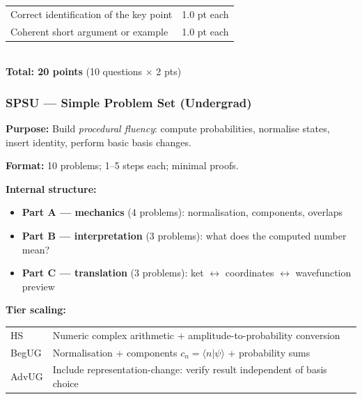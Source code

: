 \documentclass[11pt,a4paper]{article}
\begin{document}
\begin{tcolorbox}[rubricbox, title={CCQU Rubric}]
\begin{tabular}{ll}
  Correct identification of the key point & 1.0 pt each\\
  Coherent short argument or example       & 1.0 pt each\\
\end{tabular}\\[4pt]
\textbf{Total: 20 points} (10 questions $\times$ 2 pts)
\end{tcolorbox}

\bigskip
\subsubsection{SPSU --- Simple Problem Set (Undergrad)}

\begin{tcolorbox}[ugprobbox, title={SPSU --- Simple Problem Set, Undergraduate \hfill\normalfont 10 problems}]

\textbf{Purpose:} Build \emph{procedural fluency}: compute probabilities, normalise
states, insert identity, perform basic basis changes.

\medskip\textbf{Format:} 10 problems; 1--5 steps each; minimal proofs.

\medskip\textbf{Internal structure:}
\begin{itemize}[leftmargin=1.5em,itemsep=2pt]
  \item \textbf{Part A --- mechanics} (4 problems): normalisation, components, overlaps
  \item \textbf{Part B --- interpretation} (3 problems): what does the computed number mean?
  \item \textbf{Part C --- translation} (3 problems):
        ket $\leftrightarrow$ coordinates $\leftrightarrow$ wavefunction preview
\end{itemize}

\medskip\textbf{Tier scaling:}
\begin{center}
\begin{tabular}{lp{8.5cm}}
\toprule
HS    & Numeric complex arithmetic + amplitude-to-probability conversion\\
BegUG & Normalisation + components $c_n=\langle n|\psi\rangle$ + probability sums\\
AdvUG & Include representation-change: verify result independent of basis choice\\
\bottomrule
\end{tabular}
\end{center}
\end{tcolorbox}
\end{document}
